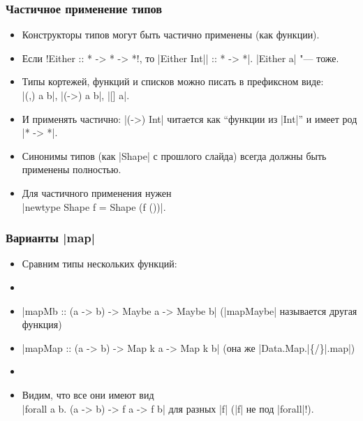 \documentclass[11pt]{beamer}
\begin{document}
\begin{frame}[fragile]
  \frametitle{Частичное применение типов}
  \begin{itemize}
    \item Конструкторы типов могут быть частично применены (как функции).
    \item Если \haskinline!Either :: * -> * -> *!, то \haskinline|Either Int|\pause\haskinline| :: * -> *|. \haskinline|Either a| "--- тоже.
          \pause
    \item Типы кортежей, функций и списков можно писать в префиксном виде: \\
          \haskinline|(,) a b|, \haskinline|(->) a b|, \haskinline|[] a|.
          \pause
    \item И применять частично: \haskinline|(->) Int| читается как \enquote{функции из \haskinline|Int|} и имеет род \pause\haskinline|* -> *|.
          \pause
    \item Синонимы типов (как \haskinline|Shape| с прошлого слайда) всегда должны быть применены полностью.
          \pause
    \item Для частичного применения нужен \\
          \haskinline|newtype Shape f = Shape (f ())|.
  \end{itemize}
\end{frame}

\begin{frame}[fragile]
  \frametitle{Варианты \haskinline|map|}
  \begin{itemize}
    \item Сравним типы нескольких функций:
    \item {}
          \pause
    \item \haskinline|mapMb :: (a -> b) -> Maybe a -> Maybe b| (\haskinline|mapMaybe| называется другая функция)
          \pause
    \item \haskinline|mapMap :: (a -> b) -> Map k a -> Map k b| (она же \haskinline|Data.Map.|\{\href{https://hackage.haskell.org/package/containers/docs/Data-Map-Lazy.html}{}/\href{https://hackage.haskell.org/package/containers/docs/Data-Map-Strict.html}{}\}\haskinline|.map|)
          \pause
    \item {} \pause
    \item Видим, что все они имеют вид \pause \\
          \haskinline|forall a b. (a -> b) -> f a -> f b| для разных \haskinline|f| (\haskinline|f| не под \haskinline|forall|!).
  \end{itemize}
\end{frame}
\end{document}
